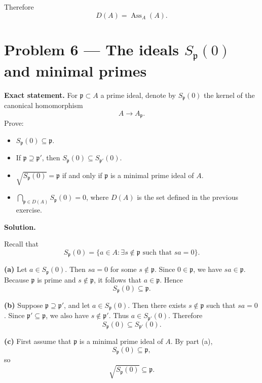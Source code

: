 \documentclass[12pt,a4paper]{article}
\theoremstyle{plain}
\theoremstyle{definition}      %
\begin{document}
	Therefore
	\[
	D(A)=\operatorname{Ass}_A(A).
	\]
	
	\bigskip
	
	\section*{Problem 6 --- The ideals \(S_{\mathfrak p}(0)\) and minimal primes}
	
	\textbf{Exact statement.}
	For \(\mathfrak p\subset A\) a prime ideal, denote by \(S_{\mathfrak p}(0)\) the kernel of the canonical homomorphism
	\[
	A\to A_{\mathfrak p}.
	\]
	Prove:
	\begin{itemize}
		\item[(a)] \(S_{\mathfrak p}(0)\subseteq \mathfrak p\).
		\item[(b)] If \(\mathfrak p\supseteq \mathfrak p'\), then \(S_{\mathfrak p}(0)\subseteq S_{\mathfrak p'}(0)\).
		\item[(c)] \(\sqrt{S_{\mathfrak p}(0)}=\mathfrak p\) if and only if \(\mathfrak p\) is a minimal prime ideal of \(A\).
		\item[(d)] \(\displaystyle \bigcap_{\mathfrak p\in D(A)} S_{\mathfrak p}(0)=0\), where \(D(A)\) is the set defined in the previous exercise.
	\end{itemize}
	
	\textbf{Solution.}
	
	Recall that
	\[
	S_{\mathfrak p}(0)=\{a\in A:\exists s\notin \mathfrak p \text{ such that } sa=0\}.
	\]
	
	\textbf{(a)} Let \(a\in S_{\mathfrak p}(0)\). Then \(sa=0\) for some \(s\notin \mathfrak p\). Since \(0\in \mathfrak p\), we have \(sa\in \mathfrak p\). Because \(\mathfrak p\) is prime and \(s\notin \mathfrak p\), it follows that \(a\in \mathfrak p\). Hence
	\[
	S_{\mathfrak p}(0)\subseteq \mathfrak p.
	\]
	
	\medskip
	
	\textbf{(b)} Suppose \(\mathfrak p\supseteq \mathfrak p'\), and let \(a\in S_{\mathfrak p}(0)\). Then there exists \(s\notin \mathfrak p\) such that \(sa=0\). Since \(\mathfrak p'\subseteq \mathfrak p\), we also have \(s\notin \mathfrak p'\). Thus \(a\in S_{\mathfrak p'}(0)\). Therefore
	\[
	S_{\mathfrak p}(0)\subseteq S_{\mathfrak p'}(0).
	\]
	
	\medskip
	
	\textbf{(c)} First assume that \(\mathfrak p\) is a minimal prime ideal of \(A\). By part (a),
	\[
	S_{\mathfrak p}(0)\subseteq \mathfrak p,
	\]
	so
	\[
	\sqrt{S_{\mathfrak p}(0)}\subseteq \mathfrak p.
	\]
	
\end{document}
